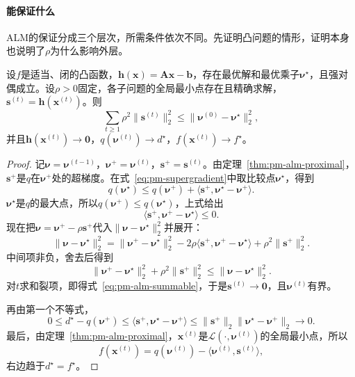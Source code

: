 \paragraph{能保证什么}
ALM的保证分成三个层次，所需条件依次不同。先证明凸问题的情形，证明本身也说明了$\rho$为什么影响外层。

\begin{theorem}[凸问题的固定参数收敛]
\label{thm:pm-alm-convex}
设$f$是适当、闭的凸函数，$\bm{h}(\bm{x})=\bm{A}\bm{x}-\bm{b}$，存在最优解和最优乘子$\bm{\nu}^\star$，且强对偶成立。设$\rho>0$固定，各子问题的全局最小点存在且精确求解，$\bm{s}^{(t)}=\bm{h}(\bm{x}^{(t)})$。则
\begin{equation}
 \sum_{t\geq1}\rho^2\lVert\bm{s}^{(t)}\rVert_2^2\leq\lVert\bm{\nu}^{(0)}-\bm{\nu}^\star\rVert_2^2,
 \label{eq:pm-alm-summable}
\end{equation}
并且$\bm{h}(\bm{x}^{(t)})\to\bm{0}$，$q(\bm{\nu}^{(t)})\to d^\star$，$f(\bm{x}^{(t)})\to f^\star$。
\end{theorem}

\begin{proof}
记$\bm{\nu}=\bm{\nu}^{(t-1)}$，$\bm{\nu}^{+}=\bm{\nu}^{(t)}$，$\bm{s}^{+}=\bm{s}^{(t)}$。由定理~\ref{thm:pm-alm-proximal}，$\bm{s}^{+}$是$q$在$\bm{\nu}^{+}$处的超梯度。在式~\eqref{eq:pm-supergradient}中取比较点$\bm{\nu}^\star$，得到
\[
 q(\bm{\nu}^\star)\leq q(\bm{\nu}^{+})+\langle\bm{s}^{+},\bm{\nu}^\star-\bm{\nu}^{+}\rangle .
\]
$\bm{\nu}^\star$是$q$的最大点，所以$q(\bm{\nu}^{+})\leq q(\bm{\nu}^\star)$，上式给出
\[
 \langle\bm{s}^{+},\bm{\nu}^{+}-\bm{\nu}^\star\rangle\leq0 .
\]
现在把$\bm{\nu}=\bm{\nu}^{+}-\rho\bm{s}^{+}$代入$\lVert\bm{\nu}-\bm{\nu}^\star\rVert_2^2$并展开：
\[
 \lVert\bm{\nu}-\bm{\nu}^\star\rVert_2^2=\lVert\bm{\nu}^{+}-\bm{\nu}^\star\rVert_2^2-2\rho\langle\bm{s}^{+},\bm{\nu}^{+}-\bm{\nu}^\star\rangle+\rho^2\lVert\bm{s}^{+}\rVert_2^2 .
\]
中间项非负，舍去后得到
\[
 \lVert\bm{\nu}^{+}-\bm{\nu}^\star\rVert_2^2+\rho^2\lVert\bm{s}^{+}\rVert_2^2\leq\lVert\bm{\nu}-\bm{\nu}^\star\rVert_2^2 .
\]
对$t$求和裂项，即得式~\eqref{eq:pm-alm-summable}，于是$\bm{s}^{(t)}\to\bm{0}$，且$\bm{\nu}^{(t)}$有界。

再由第一个不等式，
\[
 0\leq d^\star-q(\bm{\nu}^{+})\leq\langle\bm{s}^{+},\bm{\nu}^\star-\bm{\nu}^{+}\rangle\leq\lVert\bm{s}^{+}\rVert_2\lVert\bm{\nu}^\star-\bm{\nu}^{+}\rVert_2\to0 .
\]
最后，由定理~\ref{thm:pm-alm-proximal}，$\bm{x}^{(t)}$是$\mathcal{L}(\cdot,\bm{\nu}^{(t)})$的全局最小点，所以
\[
 f(\bm{x}^{(t)})=q(\bm{\nu}^{(t)})-\langle\bm{\nu}^{(t)},\bm{s}^{(t)}\rangle ,
\]
右边趋于$d^\star=f^\star$。
\end{proof}

